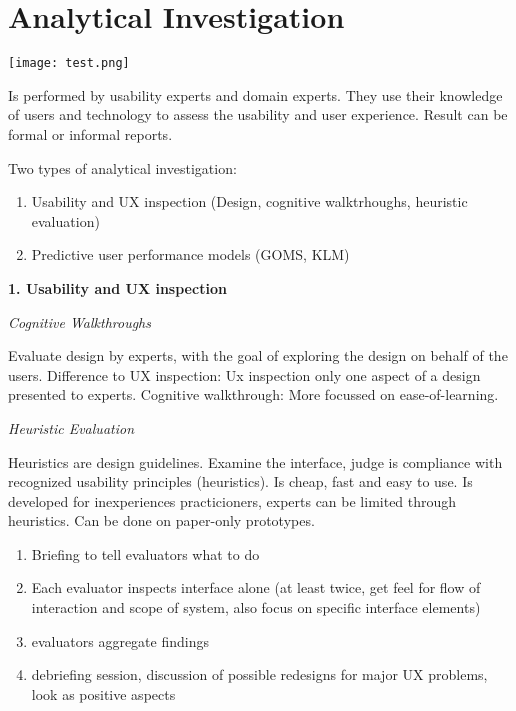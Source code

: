 \section{Analytical Investigation}

\begin{center}
	\texttt{[image: test.png]}
\end{center}

Is performed by usability experts and domain experts. They use their knowledge of users and technology to assess the usability and user experience. Result can be formal or informal reports. 

Two types of analytical investigation: 

\begin{enumerate}
    \item Usability and UX inspection (Design, cognitive walktrhoughs, heuristic evaluation)
    \item Predictive user performance models (GOMS, KLM)
\end{enumerate}

\medskip

\textbf{1. Usability and UX inspection} \smallskip

\textit{Cognitive Walkthroughs} \smallskip

Evaluate design by experts, with the goal of exploring the design on behalf of the users.
Difference to UX inspection: Ux inspection only one aspect of a design presented to experts. Cognitive walkthrough: More focussed on ease-of-learning.  \medskip

\textit{Heuristic Evaluation} \smallskip

Heuristics are design guidelines. 
Examine the interface, judge is compliance with recognized usability principles (heuristics).
Is cheap, fast and easy to use. Is developed for inexperiences practicioners, experts can be limited through heuristics. Can be done on paper-only prototypes. \smallskip


\begin{enumerate}
    \item Briefing to tell evaluators what to do
    \item Each evaluator inspects interface alone (at least twice, get feel for flow of interaction and scope of system, also focus on specific interface elements)
    \item evaluators aggregate findings
    \item debriefing session, discussion of possible redesigns for major UX problems, look as positive aspects
\end{enumerate}


